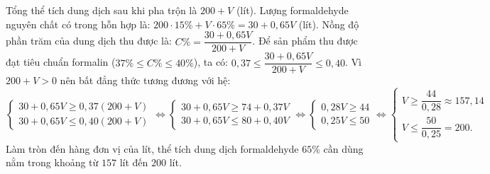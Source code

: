 \begin{bt}
{\begin{enumerate}[a)]
    Tổng thể tích dung dịch sau khi pha trộn là $200 + V$ (lít).
    Lượng formaldehyde nguyên chất có trong hỗn hợp là:
    $200 \cdot 15\% + V \cdot 65\% = 30 + 0{,}65V$ (lít).
    Nồng độ phần trăm của dung dịch thu được là:
    $C\% = \dfrac{30 + 0{,}65V}{200 + V}$.
    Để sản phẩm thu được đạt tiêu chuẩn formalin ($37\% \le C\% \le 40\%$), ta có:
    $0{,}37 \le \dfrac{30 + 0{,}65V}{200 + V} \le 0{,}40$.
    Vì $200 + V > 0$ nên bất đẳng thức tương đương với hệ:
    $\begin{cases} 30 + 0{,}65V \ge 0{,}37(200 + V) \\ 30 + 0{,}65V \le 0{,}40(200 + V) \end{cases} \iff \begin{cases} 30 + 0{,}65V \ge 74 + 0{,}37V \\ 30 + 0{,}65V \le 80 + 0{,}40V \end{cases} \iff \begin{cases} 0{,}28V \ge 44 \\ 0{,}25V \le 50 \end{cases} \iff \begin{cases} V \ge \dfrac{44}{0{,}28} \approx 157{,}14 \\ V \le \dfrac{50}{0{,}25} = 200. \end{cases}$
    Làm tròn đến hàng đơn vị của lít, thể tích dung dịch formaldehyde $65\%$ cần dùng nằm trong khoảng từ $157$ lít đến $200$ lít.
\end{enumerate}
}
\end{bt}

